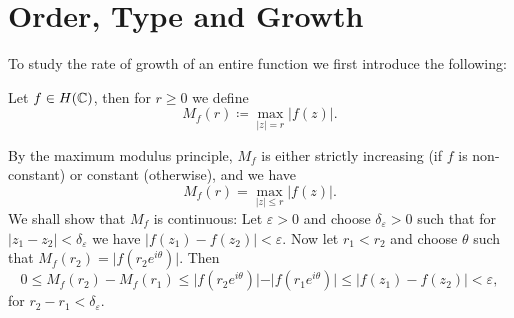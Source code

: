 \section{Order, Type and Growth}

To study the rate of growth of an entire function we first introduce the following:
\begin{definition}
    Let $f \in H(\mathbb{C})$, then for $r \geq 0$ we define
    \begin{equation*}
        M_f(r) \coloneqq \max_{\vert z \vert = r} \vert f(z) \vert.
    \end{equation*}
\end{definition}

\begin{remark}    
    By the maximum modulus principle, $M_f$ is either strictly increasing (if $f$ is non-constant) or constant (otherwise), and we have
    $$ M_f(r) = \max_{\vert z \vert \leq r} \vert f(z) \vert. $$
    We shall show that $M_f$ is continuous: Let $\varepsilon > 0$ and choose $\delta_\varepsilon > 0$ such that for ${\vert z_1 - z_2 \vert < \delta_\varepsilon}$ we have ${\vert f(z_1) - f(z_2) \vert < \varepsilon}$. Now let $r_1 < r_2$ and choose $\theta$ such that $M_f(r_2) = \vert f(r_2 e^{i \theta}) \vert$. Then
    \begin{equation*}
        0 \leq M_f(r_2) - M_f(r_1) \leq \vert f(r_2 e^{i \theta}) \vert - \vert f(r_1 e^{i \theta}) \vert \leq \vert f(z_1) - f(z_2) \vert < \varepsilon,
    \end{equation*}
    for $r_2 - r_1 < \delta_\varepsilon$.
\end{remark}




